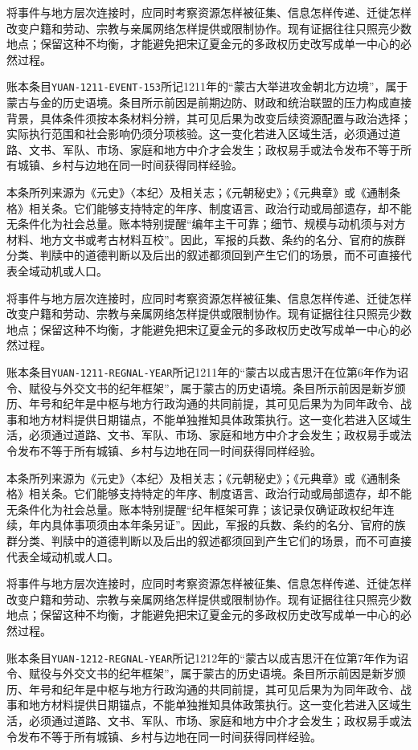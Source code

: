 将事件与地方层次连接时，应同时考察资源怎样被征集、信息怎样传递、迁徙怎样改变户籍和劳动、宗教与亲属网络怎样提供或限制协作。现有证据往往只照亮少数地点；保留这种不均衡，才能避免把宋辽夏金元的多政权历史改写成单一中心的必然过程。

账本条目\texttt{YUAN-1211-EVENT-153}所记1211年的“蒙古大举进攻金朝北方边境”，属于蒙古与金的历史语境。条目所示前因是前期边防、财政和统治联盟的压力构成直接背景，具体条件须按本条材料分辨，其可见后果为改变后续资源配置与政治选择；实际执行范围和社会影响仍须分项核验。这一变化若进入区域生活，必须通过道路、文书、军队、市场、家庭和地方中介才会发生；政权易手或法令发布不等于所有城镇、乡村与边地在同一时间获得同样经验。

本条所列来源为《元史》〈本纪〉及相关志；《元朝秘史》；《元典章》或《通制条格》相关条。它们能够支持特定的年序、制度语言、政治行动或局部遗存，却不能无条件化为社会总量。账本特别提醒“编年主干可靠；细节、规模与动机须与对方材料、地方文书或考古材料互校”。因此，军报的兵数、条约的名分、官府的族群分类、判牍中的道德判断以及后出的叙述都须回到产生它们的场景，而不可直接代表全域动机或人口。

将事件与地方层次连接时，应同时考察资源怎样被征集、信息怎样传递、迁徙怎样改变户籍和劳动、宗教与亲属网络怎样提供或限制协作。现有证据往往只照亮少数地点；保留这种不均衡，才能避免把宋辽夏金元的多政权历史改写成单一中心的必然过程。

账本条目\texttt{YUAN-1211-REGNAL-YEAR}所记1211年的“蒙古以成吉思汗在位第6年作为诏令、赋役与外交文书的纪年框架”，属于蒙古的历史语境。条目所示前因是新岁颁历、年号和纪年是中枢与地方行政沟通的共同前提，其可见后果为为同年政令、战事和地方材料提供日期锚点，不能单独推知具体政策执行。这一变化若进入区域生活，必须通过道路、文书、军队、市场、家庭和地方中介才会发生；政权易手或法令发布不等于所有城镇、乡村与边地在同一时间获得同样经验。

本条所列来源为《元史》〈本纪〉及相关志；《元朝秘史》；《元典章》或《通制条格》相关条。它们能够支持特定的年序、制度语言、政治行动或局部遗存，却不能无条件化为社会总量。账本特别提醒“纪年框架可靠；该记录仅确证政权纪年连续，年内具体事项须由本年条另证”。因此，军报的兵数、条约的名分、官府的族群分类、判牍中的道德判断以及后出的叙述都须回到产生它们的场景，而不可直接代表全域动机或人口。

将事件与地方层次连接时，应同时考察资源怎样被征集、信息怎样传递、迁徙怎样改变户籍和劳动、宗教与亲属网络怎样提供或限制协作。现有证据往往只照亮少数地点；保留这种不均衡，才能避免把宋辽夏金元的多政权历史改写成单一中心的必然过程。

账本条目\texttt{YUAN-1212-REGNAL-YEAR}所记1212年的“蒙古以成吉思汗在位第7年作为诏令、赋役与外交文书的纪年框架”，属于蒙古的历史语境。条目所示前因是新岁颁历、年号和纪年是中枢与地方行政沟通的共同前提，其可见后果为为同年政令、战事和地方材料提供日期锚点，不能单独推知具体政策执行。这一变化若进入区域生活，必须通过道路、文书、军队、市场、家庭和地方中介才会发生；政权易手或法令发布不等于所有城镇、乡村与边地在同一时间获得同样经验。


